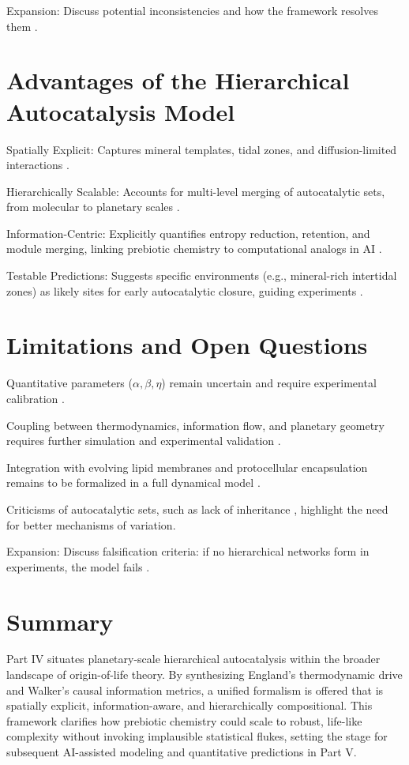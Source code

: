 \documentclass[openany]{book}
\begin{document}
Expansion: Discuss potential inconsistencies and how the framework resolves them \citep{england2015, walker2017}.

\section{Advantages of the Hierarchical Autocatalysis Model}
Spatially Explicit: Captures mineral templates, tidal zones, and diffusion-limited interactions \citep{barge2022}.

Hierarchically Scalable: Accounts for multi-level merging of autocatalytic sets, from molecular to planetary scales \citep{peng2022}.

Information-Centric: Explicitly quantifies entropy reduction, retention, and module merging, linking prebiotic chemistry to computational analogs in AI \citep{scalinghypothesis}.

Testable Predictions: Suggests specific environments (e.g., mineral-rich intertidal zones) as likely sites for early autocatalytic closure, guiding experiments \citep{sokolskyi2024}.

\section{Limitations and Open Questions}
Quantitative parameters ($\alpha, \beta, \eta$) remain uncertain and require experimental calibration \citep{matreux2024}.

Coupling between thermodynamics, information flow, and planetary geometry requires further simulation and experimental validation \citep{plum2025}.

Integration with evolving lipid membranes and protocellular encapsulation remains to be formalized in a full dynamical model \citep{deamer2017}.

Criticisms of autocatalytic sets, such as lack of inheritance \citep{vasas2010, lifson1997}, highlight the need for better mechanisms of variation.

Expansion: Discuss falsification criteria: if no hierarchical networks form in experiments, the model fails \citep{kocher2023}.

\section{Summary}
Part IV situates planetary-scale hierarchical autocatalysis within the broader landscape of origin-of-life theory. By synthesizing England’s thermodynamic drive and Walker’s causal information metrics, a unified formalism is offered that is spatially explicit, information-aware, and hierarchically compositional. This framework clarifies how prebiotic chemistry could scale to robust, life-like complexity without invoking implausible statistical flukes, setting the stage for subsequent AI-assisted modeling and quantitative predictions in Part V.
\end{document}
